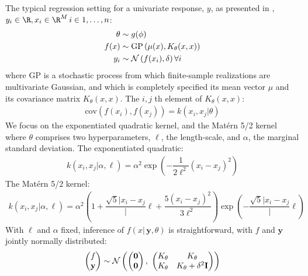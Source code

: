 \documentclass{article}
\newcommand{\lp}{\ensuremath{\left(}}
\newcommand{\rp}{\ensuremath{\right)}}
\begin{document}
The typical regression setting for a univariate response, $y$, as presented in \citet{flaxman2015fast},
$y_i \in \R, x_i \in \R^M\, i \in {1,\dots,n}$:
\begin{align*}
  \theta & \sim g(\phi) \\
  f(x) & \sim \text{GP}\lp \mu(x),
  K_\theta(x, x) \rp \\
  y_i & \sim \mathcal{N}\lp f(x_i), \delta \rp \forall i \\
\end{align*}
where $\text{GP}$ is a stochastic process from which finite-sample realizations are
multivariate Gaussian, and which is completely specified its mean vector $\mu$
and its covariance matrix $K_\theta(x, x)$. The $i, j$ th
element of $K_\theta(x, x)$:
\begin{align*}
  \text{cov}(f(x_i), f(x_j)) = k(x_i, x_j | \theta) 
\end{align*}
We focus on the exponentiated quadratic kernel, and the Mat\'{e}rn 5/2 kernel
where $\theta$ comprises two hyperparameters, $\ell$, the length-scale, and
$\alpha$, the marginal standard deviation. The exponentiated quadratic:
\begin{align} \label{kern_quad}
  k(x_i, x_j | \alpha, \ell) = \alpha^2 
\exp \left(
	- \dfrac{1}{2\ell^2} (x_{i} - x_{j})^2
\right)
\end{align}
%
The Mat\'{e}rn 5/2 kernel:
%
\begin{align} \label{kern_quad}
  k(x_i, x_j | \alpha, \ell) = \alpha^2 
	\left( 
	1 + \dfrac{\sqrt{5} |x_{i} - x_{j}}|{\ell} + \dfrac{5(x_{i} - x_{j})^2}{3\ell^2}
	\right)
	\exp \left(
	- \dfrac{\sqrt{5}{|x_{i} - x_{j}}}|{\ell} 
\right)
\end{align}
With $\ell$ and $\alpha$ fixed, inference of $f(x | \, \mathbf{y}, \theta)$ is
straightforward, with $f$ and $\mathbf{y}$ jointly normally distributed:
\begin{align*} \begin{pmatrix} f\\ \mathbf{y} \\ \end{pmatrix} \sim
\mathcal{N} \lp \begin{pmatrix} \mathbf{0} \\ \mathbf{0} \end{pmatrix} ,\,\,
  \begin{pmatrix} K_\theta &
  K_\theta  \\ K_\theta &
  K_\theta + \delta ^ 2 \mathbf{I}\\ \end{pmatrix} \rp
\end{align*}
\end{document}
